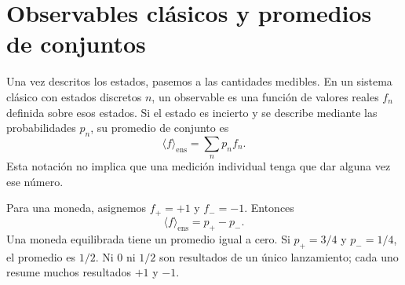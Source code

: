 \begin{classroomqa}
\end{classroomqa}

\section{Observables clásicos y promedios de conjuntos}

Una vez descritos los estados, pasemos a las cantidades medibles. En un sistema clásico con estados discretos \(n\), un observable es una función de valores reales \(f_n\) definida sobre esos estados. Si el estado es incierto y se describe mediante las probabilidades \(p_n\), su promedio de conjunto es
\begin{equation}
  \langle f\rangle_{\mathrm{ens}}
  =\sum_n p_n f_n.
  \label{eq:l02-classical-expectation}
\end{equation}
Esta notación no implica que una medición individual tenga que dar alguna vez ese número.

Para una moneda, asignemos \(f_+=+1\) y \(f_-=-1\). Entonces
\begin{equation}
  \langle f\rangle_{\mathrm{ens}}
  =p_+-p_-.
  \label{eq:l02-coin-expectation}
\end{equation}
Una moneda equilibrada tiene un promedio igual a cero. Si \(p_+=3/4\) y \(p_-=1/4\), el promedio es \(1/2\). Ni \(0\) ni \(1/2\) son resultados de un único lanzamiento; cada uno resume muchos resultados \(+1\) y \(-1\).

\begin{classroomqa}
\end{classroomqa}

